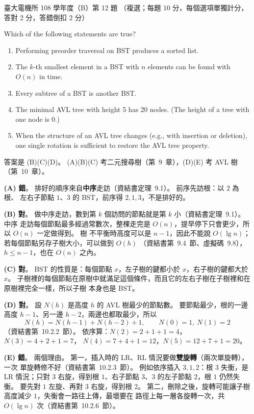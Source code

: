 \begin{pastexam}[label={px:ntu-108-ee-dsb-12}]{臺大電機所 108 學年度（B）第 12 題}
（複選；每題 10 分，每個選項單獨計分，答對 2 分，答錯倒扣 2 分）

Which of the following statements are true?
\begin{enumerate}[label=(\Alph*).]
\item Performing preorder traversal on BST produces a sorted list.
\item The $k$-th smallest element in a BST with $n$ elements can be found with $O(n)$ in time.
\item Every subtree of a BST is another BST.
\item The minimal AVL tree with height 5 has 20 nodes. (The height of a tree with one node is 0.)
\item When the structure of an AVL tree changes (e.g., with insertion or deletion), one single
rotation is sufficient to restore the AVL tree property.
\end{enumerate}
\end{pastexam}

\begin{pastsoln}
答案是 (B)(C)(D)。 (A)(B)(C) 考二元搜尋樹（第~9~章），(D)(E) 考 AVL 樹（第~10~章）。

\textbf{(A) 錯}。 排好的順序來自\textbf{中序}走訪（資結書定理~9.1）。 前序先訪根：以 $2$ 為根、
左右子節點 $1$、$3$ 的 BST，前序得 $2, 1, 3$，不是排好的。

\textbf{(B) 對}。 做中序走訪，數到第 $k$ 個訪問的節點就是第 $k$ 小（資結書定理~9.1）。 中序
走訪每個節點最多經過常數次，整棵走完是 $O(n)$，提早停下只會更少，所以 $O(n)$ 一定做得到。 樹
不平衡時高度可以是 $n - 1$，因此不能說 $O(\lg n)$；若每個節點另存子樹大小，可以做到 $O(h)$
（資結書第~9.4~節、虛擬碼~9.8），$h \le n - 1$，也在 $O(n)$ 之內。

\textbf{(C) 對}。 BST 的性質是：每個節點 $x$，左子樹的鍵都小於 $x$，右子樹的鍵都大於 $x$。
子樹裡的每個節點在原樹中就滿足這個條件，而且它的左右子樹在子樹裡和在原樹裡完全一樣，所以子樹
本身也是 BST。

\textbf{(D) 對}。 設 $N(h)$ 是高度 $h$ 的 AVL 樹最少的節點數。 要節點最少，根的一邊高度
$h - 1$、另一邊 $h - 2$，兩邊也都取最少，所以
\[
N(h) = N(h-1) + N(h-2) + 1,\qquad N(0) = 1,\ N(1) = 2
\]
（資結書第~10.2.2~節）。 依序算：$N(2) = 2 + 1 + 1 = 4$，$N(3) = 4 + 2 + 1 = 7$，
$N(4) = 7 + 4 + 1 = 12$，$N(5) = 12 + 7 + 1 = 20$。

\textbf{(E) 錯}。 兩個理由。 第一，插入時的 LR、RL 情況要做\textbf{雙旋轉}（兩次單旋轉），一次
單旋轉修不好（資結書第~10.2.3~節）。 例如依序插入 $3, 1, 2$：根 $3$ 失衡，是 LR 情況；只對 $3$
右旋，得到根 $1$、右子節點 $3$、$3$ 的左子節點 $2$，根 $1$ 仍然失衡。 要先對 $1$ 左旋、再對 $3$
右旋，得到根 $2$。 第二，刪除之後，旋轉可能讓子樹高度減少 $1$，失衡會一路往上傳，最壞要在
路徑上每一層各旋轉一次，共 $O(\lg n)$ 次（資結書第~10.2.6~節）。
\end{pastsoln}
